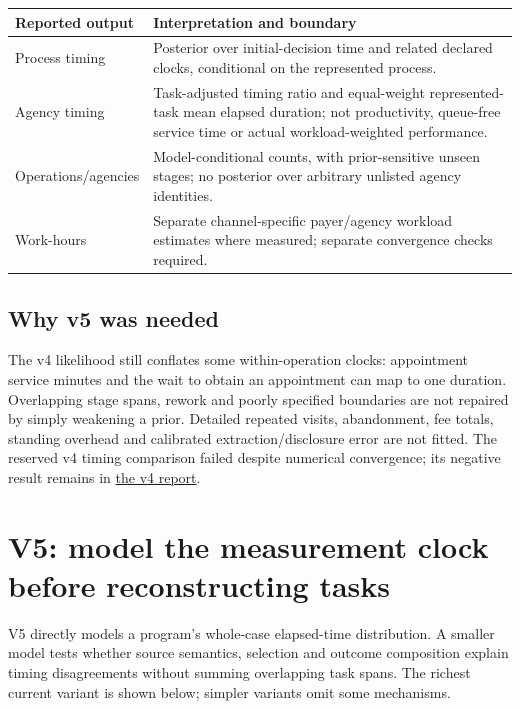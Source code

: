 \documentclass[10pt]{article}
\newcommand{\repo}[2]{\href{../../../#1}{#2}}
\begin{document}
\begin{tabularx}{\linewidth}{@{}p{.24\linewidth}Y@{}}
\toprule Reported output & Interpretation and boundary \\
\midrule
Process timing & Posterior over initial-decision time and related declared clocks, conditional on the represented process. \\
Agency timing & Task-adjusted timing ratio and equal-weight represented-task mean elapsed duration; not productivity, queue-free service time or actual workload-weighted performance. \\
Operations/agencies & Model-conditional counts, with prior-sensitive unseen stages; no posterior over arbitrary unlisted agency identities. \\
Work-hours & Separate channel-specific payer/agency workload estimates where measured; separate convergence checks required. \\
\bottomrule
\end{tabularx}

\subsection*{Why v5 was needed}
The v4 likelihood still conflates some within-operation clocks: appointment
service minutes and the wait to obtain an appointment can map to one duration.
Overlapping stage spans, rework and poorly specified boundaries are not repaired
by simply weakening a prior. Detailed repeated visits, abandonment, fee totals,
standing overhead and calibrated extraction/disclosure error are not fitted.
The reserved v4 timing comparison failed despite numerical convergence; its
negative result remains in \repo{docs/2026-09-16-bayesian-process-v4-results.md}{the v4 report}.

\clearpage
\section{V5: model the measurement clock before reconstructing tasks}
\label{sec:v5}
V5 directly models a program's whole-case elapsed-time distribution. A smaller
model tests whether source semantics, selection and outcome composition explain
timing disagreements without summing overlapping task spans. The richest current
variant is shown below; simpler variants omit some mechanisms.
\end{document}
